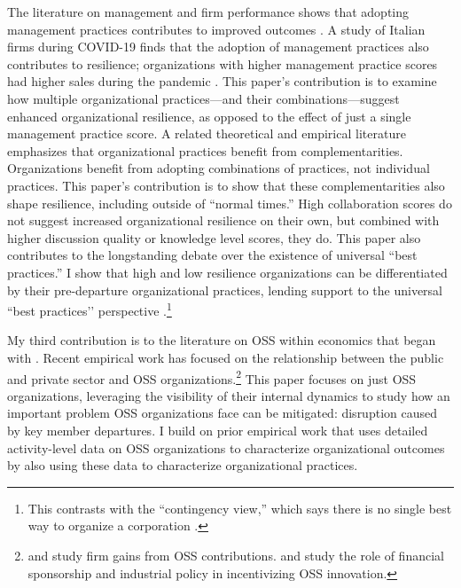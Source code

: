 \documentclass[12pt,notitlepage]{article}
\begin{document}
The literature on management and firm performance shows that adopting management practices contributes to improved outcomes \citep{bloom_india_2012, bloom_management_tech_2017, bruhn_consulting_2018}. 
A study of Italian firms during COVID-19 finds that the adoption of management practices also contributes to resilience; organizations with higher management practice scores had higher sales during the pandemic \citep{lamogese_resilience_2024}.
This paper’s contribution is to examine how multiple organizational practices—and their combinations—suggest enhanced organizational resilience, as opposed to the effect of just a single management practice score. 
A related theoretical \citep{milgrom_Manufacturing_1990, MILGROM1995179} and empirical literature \citep{ichniowski_effects_1997} emphasizes that organizational practices benefit from complementarities.
Organizations benefit from adopting combinations of practices, not individual practices.
This paper's contribution is to show that these complementarities also shape resilience, including outside of “normal times.”
High collaboration scores do not suggest increased organizational resilience on their own, but combined with higher discussion quality or knowledge level scores, they do.
This paper also contributes to the longstanding debate over the existence of universal ``best practices.''
I show that high and low resilience organizations can be differentiated by their pre-departure organizational practices, lending support to the universal “best practices’’ perspective \citep{taylor1911principles}.\footnote{This contrasts with the “contingency view,” which says there is no single best way to organize a corporation \citep{woodward1965management}.}

My third contribution is to the literature on OSS within economics that began with \cite{lerner_open_2001, lerner_simple_2002}.
Recent empirical work has focused on the relationship between the public and private sector and OSS organizations.\footnote{\cite{nagle_open_2017} and \cite{conti_beefing_2025} study firm gains from OSS contributions.
\cite{conti_incentivizing_2023} and \cite{gortmaker_open_2025} study the role of financial sponsorship and industrial policy in incentivizing OSS innovation. }
This paper focuses on just OSS organizations, leveraging the visibility of their internal dynamics to study how an important problem OSS organizations face can be mitigated: disruption caused by key member departures. 
I build on prior empirical work that uses detailed activity-level data on OSS organizations to characterize organizational outcomes by also using these data to characterize organizational practices.
\end{document}
